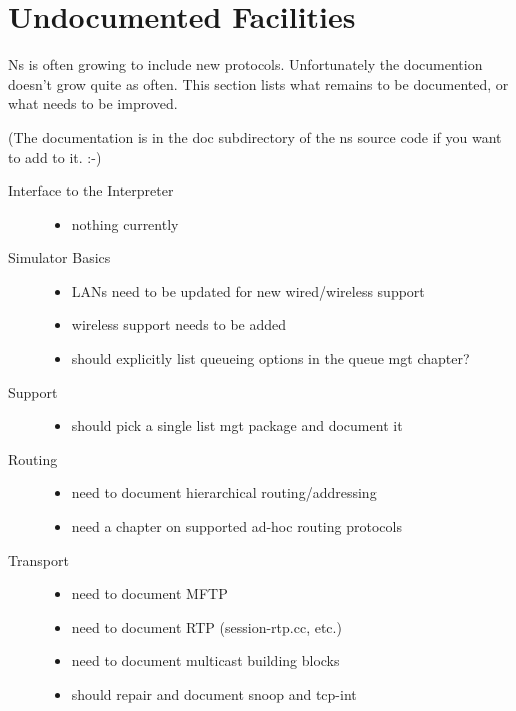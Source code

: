 
\chapter{Undocumented Facilities}

Ns is often growing to include new protocols.
Unfortunately the documention doesn't grow quite as often.
This section lists what remains to be documented,
  or what needs to be improved.

(The documentation is in the doc subdirectory of the ns source code
  if you want to add to it. :-)

\begin{description}
\item[Interface to the Interpreter]

	\begin{itemize}
	\item nothing currently
	\end{itemize}

\item[Simulator Basics]

	\begin{itemize}
	\item LANs need to be updated for new wired/wireless support
	\item wireless support needs to be added
	\item should explicitly list queueing options in the queue mgt chapter?
	\end{itemize}

\item[Support]

	\begin{itemize}
	\item should pick a single list mgt package and document it
	\end{itemize}

\item[Routing]

	\begin{itemize}
	\item need to document hierarchical routing/addressing
	\item need a chapter on supported ad-hoc routing protocols
	\end{itemize}

\item[Transport]

	\begin{itemize}
	\item need to document MFTP
	\item need to document RTP (session-rtp.cc, etc.)
	\item need to document multicast building blocks
	\item should repair and document snoop and tcp-int
	\end{itemize}


\end{description}
